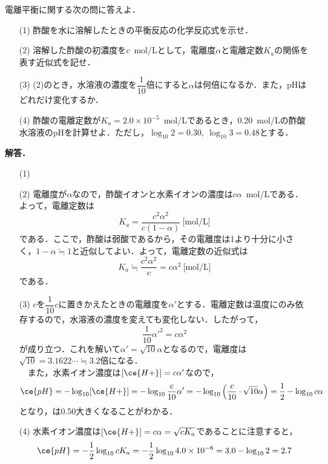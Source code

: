 \documentclass[a4paper,11pt]{ltjsarticle}
\begin{document}
\begin{que}
    電離平衡に関する次の問に答えよ．
\begin{itemize}%
    \item [(1)]酢酸を水に溶解したときの平衡反応の化学反応式を示せ．
    \item [(2)]溶解した酢酸の初濃度を$c$~mol/Lとして，電離度$\alpha$と電離定数$K_a$の関係を表す近似式を記せ．
    \item [(3)](2)のとき，水溶液の濃度を$\dfrac{1}{10}$倍にすると$\alpha$は何倍になるか．また，pHはどれだけ変化するか．
    \item [(4)]酢酸の電離定数が$K_a=2.0\times 10^{-5}$~mol/Lであるとき，$0.20$~mol/Lの酢酸水溶液のpHを計算せよ．ただし，$\log_{10}2=0.30,~\log_{10}3=0.48$とする．
\end{itemize}
\end{que}
\noindent\textbf{解答．}
\begin{itemize}
    \item [(1)]
\item[(2)]電離度が$\alpha$なので，酢酸イオンと水素イオンの濃度は$c\alpha$~mol/Lである．よって，電離定数は
\[K_a=\frac{c^2\alpha^2}{c(1-\alpha)}~\text{[mol/L]}\]
である．ここで，酢酸は弱酸であるから，その電離度は1より十分に小さく，$1-\alpha \fallingdotseq 1$と近似してよい．よって，電離定数の近似式は
\[K_a\fallingdotseq \frac{c^2\alpha^2}{c}=c\alpha^2~\text{[mol/L]}\]
である．
\item[(3)]$c$を$\dfrac{1}{10}c$に置きかえたときの電離度を$\alpha'$とする．電離定数は温度にのみ依存するので，水溶液の濃度を変えても変化しない．したがって，
\[\frac1{10}\alpha'^2=c\alpha^2\]
が成り立つ．これを解いて$\alpha'=\sqrt{10}\alpha$となるので，電離度は$\sqrt{10}=3.1622\cdots\fallingdotseq 3.2$倍になる．\\
　また，水素イオン濃度は$[\ce{H+}]=c\alpha'$なので，
\[\ce{pH}=-\log_{10}[\ce{H+}]=-\log_{10}\frac{c}{10}\alpha'=-\log_{10}\left(\frac c{10}\cdot\sqrt{10}\alpha\right)=\frac12-\log_{10}c\alpha\]
となり，は0.50大きくなることがわかる．
\item[(4)]水素イオン濃度は$[\ce{H+}]=c\alpha=\sqrt{cK_a}$であることに注意すると，
\[\ce{pH}=-\frac12\log_{10}cK_a=-\frac12\log_{10}4.0\times 10^{-6}=3.0-
\log_{10}2=2.7\]
\end{itemize}
\newpage
\end{document}
